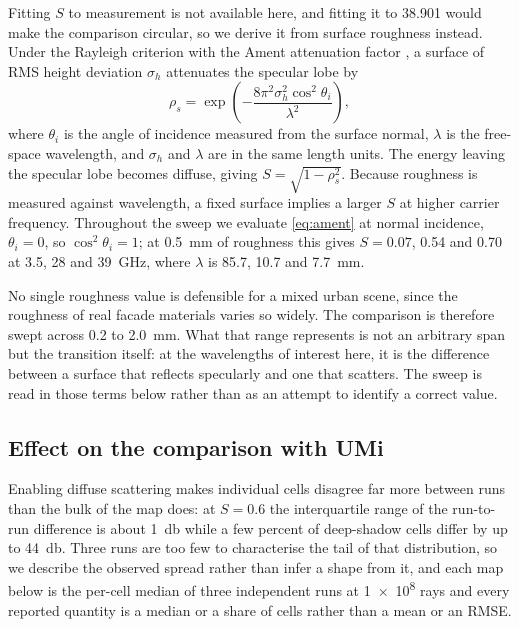 \documentclass[conference]{IEEEtran}
\begin{document}
Fitting $S$ to measurement is not available here, and fitting it to 38.901
would make the comparison circular, so we derive it from surface roughness
instead. Under the Rayleigh criterion with the Ament attenuation factor
\cite{ament1953rough}, a surface of RMS height deviation
$\sigma_h$ attenuates the specular lobe by
\begin{equation}
\rho_s = \exp\!\left(-\frac{8\pi^2 \sigma_h^2 \cos^2\theta_i}{\lambda^2}\right),
\label{eq:ament}
\end{equation}
where $\theta_i$ is the angle of incidence measured from the surface normal,
$\lambda$ is the free-space wavelength, and $\sigma_h$ and $\lambda$ are in
the same length units. The energy leaving the specular lobe becomes diffuse,
giving $S = \sqrt{1-\rho_s^2}$. Because roughness is measured against
wavelength, a fixed surface implies a larger $S$ at higher carrier frequency.
Throughout the sweep we evaluate \eqref{eq:ament} at normal incidence,
$\theta_i = 0$, so $\cos^2\theta_i = 1$; at \SI{0.5}{\milli\metre} of
roughness this gives $S = 0.07$, \num{0.54} and \num{0.70} at \SI{3.5}{},
\SI{28}{} and \SI{39}{\giga\hertz}, where $\lambda$ is \SI{85.7}{},
\SI{10.7}{} and \SI{7.7}{\milli\metre}.

No single roughness value is defensible for a mixed urban scene, since the
roughness of real facade materials varies so widely. The comparison is
therefore swept across \SI{0.2}{} to \SI{2.0}{\milli\metre}. What that range
represents is not an arbitrary span but the transition itself: at the
wavelengths of interest here, it is the difference between a surface that
reflects specularly and one that scatters. The sweep is read in those terms
below rather than as an attempt to identify a correct value.

\subsection{Effect on the comparison with UMi}

Enabling diffuse scattering makes individual cells disagree far more between
runs than the bulk of the map does: at $S = 0.6$ the interquartile range of
the run-to-run difference is about \SI{1}{\decibel} while a few percent of
deep-shadow cells differ by up to \SI{44}{\decibel}. Three runs are too few
to characterise the tail of that distribution, so we describe the observed
spread rather than infer a shape from it, and each map below
is the per-cell median of three independent runs at \num{1e8} rays and every
reported quantity is a median or a share of cells rather than a mean or an
RMSE.
\end{document}

